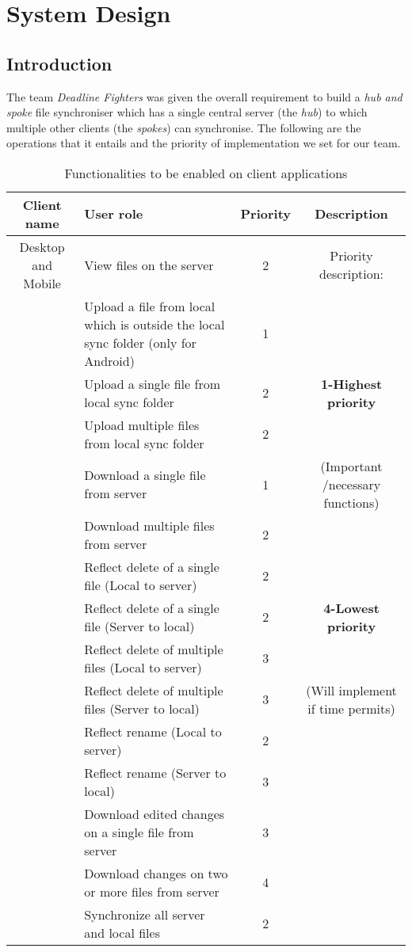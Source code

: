 \section{System Design}
\subsection{Introduction}
The team \emph{Deadline Fighters} was given the overall requirement to build a \emph{hub and spoke} file synchroniser which has a single central server (the \emph{hub}) to which multiple other clients (the \emph{spokes}) can synchronise. The following are the operations that it entails and the priority of implementation we set for our team.

\bgroup
\def\arraystretch{1.3}
\begin{table}[H]
\centering
\begin{tabular}{|c|m{8cm}|c|c|}
\hline
Client name & User role & Priority & Description\\
\hline
{Desktop and Mobile} & View files on the server & 2 &{Priority description:} \\
\cline{2-3}
& Upload a file from local which is outside the local sync folder (only for Android)& 1&{}  \\
\cline{2-3}
& Upload a single file from local sync folder & 2&{\textbf{1-Highest priority}}\\
\cline{2-3}
& Upload multiple files from local sync folder & 2&{}\\
\cline{2-3}
&Download a single file from server & 1 &{(Important /necessary functions)}\\
\cline{2-3}
&Download multiple files from server & 2&{}\\
\cline{2-3}
&Reflect delete of a single file (Local to server) & 2&{}\\
\cline{2-3}
&Reflect delete of a single file (Server to local) & 2&{\textbf{4-Lowest priority}}\\
\cline{2-3}
&Reflect delete of multiple files (Local to server) & 3 &{}\\
\cline{2-3}
&Reflect delete of multiple files (Server to local) & 3&{(Will implement if time permits)}\\
\cline{2-3}
&Reflect rename (Local to server) & 2&{}\\
\cline{2-3}
&Reflect rename (Server to local) & 3&{}\\
\cline{2-3}
&Download edited changes on a single file from server & 3&{}\\
\cline{2-3}
&Download changes on two or more files from server & 4&{}\\
\cline{2-3}
&Synchronize all server and local files & 2&{}\\
\hline
\bottomrule
\end{tabular}
\caption{Functionalities to be enabled on client applications}
\end{table}
\egroup



